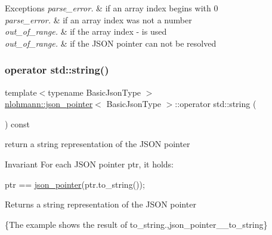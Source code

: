 \begin{DoxyExceptions}{Exceptions}
{\em parse\+\_\+error.} & if an array index begins with \textquotesingle{}0\textquotesingle{} \\
\hline
{\em parse\+\_\+error.} & if an array index was not a number \\
\hline
{\em out\+\_\+of\+\_\+range.} & if the array index \textquotesingle{}-\/\textquotesingle{} is used \\
\hline
{\em out\+\_\+of\+\_\+range.} & if the J\+S\+ON pointer can not be resolved \\
\hline
\end{DoxyExceptions}
\mbox{\label{classnlohmann_1_1json__pointer_ae9015c658f99cf3d48a8563accc79988}} 
\subsubsection{\texorpdfstring{operator std\+::string()}{operator std::string()}}
{\footnotesize\ttfamily template$<$typename Basic\+Json\+Type $>$ \\
\mbox{\hyperlink{classnlohmann_1_1json__pointer}{nlohmann\+::json\+\_\+pointer}}$<$ Basic\+Json\+Type $>$\+::operator std\+::string (\begin{DoxyParamCaption}{ }\end{DoxyParamCaption}) const\hspace{0.3cm}{\ttfamily [inline]}}



return a string representation of the J\+S\+ON pointer 

\begin{DoxyInvariant}{Invariant}
For each J\+S\+ON pointer {\ttfamily ptr}, it holds\+: 
\begin{DoxyCode}
ptr == \mbox{\hyperlink{classnlohmann_1_1json__pointer_a7f32d7c62841f0c4a6784cf741a6e4f8}{json\_pointer}}(ptr.to\_string());
\end{DoxyCode}

\end{DoxyInvariant}
\begin{DoxyReturn}{Returns}
a string representation of the J\+S\+ON pointer
\end{DoxyReturn}
\{The example shows the result of {\ttfamily to\+\_\+string}.,json\+\_\+pointer\+\_\+\+\_\+to\+\_\+string\}

